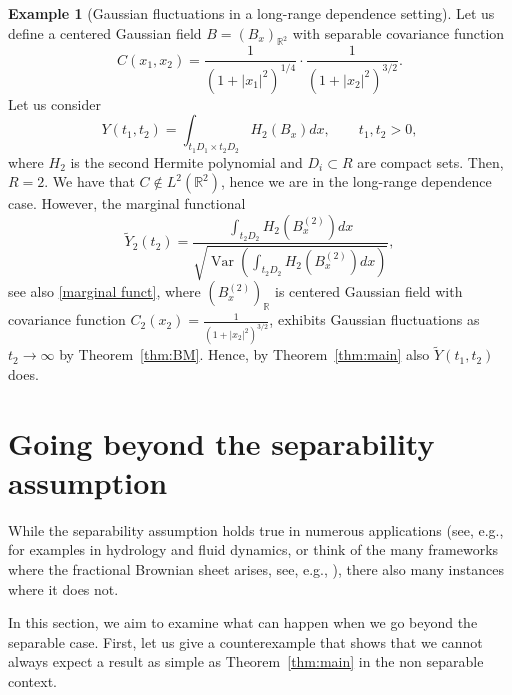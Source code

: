 \documentclass[12pt]{article}
\DeclareMathOperator{\var}{Var}
\DeclareMathOperator{\1}{1}
\newcommand{\R}{\mathbb{R}}
\theoremstyle{plain}
\theoremstyle{definition}
\newtheorem{example}{Example}
\begin{document}
\begin{example}[Gaussian fluctuations in a long-range dependence setting]\label{ex:longmemory}
Let us define a centered Gaussian field $B=(B_x)_{\R^2}$ with separable covariance function
 \begin{equation}
    C(x_1,x_2) = \frac{1}{(1+|x_1|^2)^{1/4}} \cdot \frac{1}{(1+|x_2|^2)^{3/2}}.
\end{equation}
Let us consider \begin{equation}
    Y(t_1,t_2) = \int_{t_1D_1\times t_2D_2} H_2(B_x) dx, \quad \quad t_1,t_2>0,
\end{equation}
where $H_2$ is the second Hermite polynomial and $D_i\subset R$ are compact sets. Then, $R=2$. We have that $C \notin L^2(\R^2)$, hence we are in the long-range dependence case. However, the marginal functional \begin{equation}
    \widetilde Y_2(t_2) = \frac{\int_{t_2D_2} H_2(B^{(2)}_x) dx}{\sqrt{\var\left(\int_{t_2D_2} H_2(B^{(2)}_x) dx\right)}}, 
\end{equation}
see also \eqref{marginal funct}, where $(B^{(2)}_x)_{\R}$ is  centered Gaussian field with covariance function $C_2(x_2)=\frac{1}{(1+|x_2|^2)^{3/2}}$, exhibits Gaussian fluctuations as $t_2\to \infty$ by Theorem~\ref{thm:BM}. Hence, by Theorem~\ref{thm:main} also $\widetilde Y(t_1,t_2)$ does.
\end{example}

\section{Going beyond the separability assumption}\label{sec:nonsep}
While the separability assumption holds true in numerous applications (see, e.g., \cite[Chapter 5]{Christakos1992RandomFM} for examples in hydrology and fluid dynamics, or think of the many frameworks where the fractional Brownian sheet arises, see, e.g., \cite{OZ,SW17}), there also many instances where it does not.

In this section, we aim to examine what can happen when we go beyond the separable case.
First, let us give a counterexample that shows that we cannot always expect a result as simple as Theorem~\ref{thm:main} 
in the non separable context. 
\end{document}
